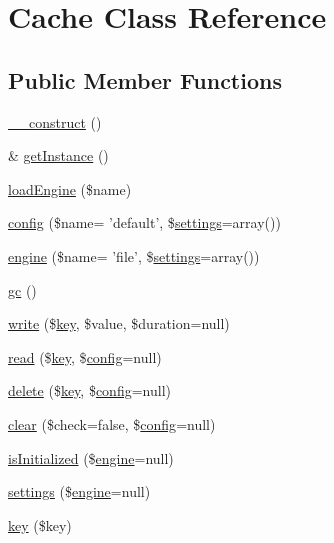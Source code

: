 \hypertarget{class_cache}{\section{Cache Class Reference}
\label{class_cache}
}
\subsection*{Public Member Functions}
\begin{DoxyCompactItemize}
\item 
\hyperlink{class_cache_a095c5d389db211932136b53f25f39685}{\-\_\-\-\_\-construct} ()
\item 
\& \hyperlink{class_cache_a24722ded84823064fa9927e17344d095}{get\-Instance} ()
\item 
\hyperlink{class_cache_a71966fba19d8d30f58bde31dac2535e4}{load\-Engine} (\$name)
\item 
\hyperlink{class_cache_aeee7a9202d7c4e6283d6b2d6fc3c49d1}{config} (\$name= 'default', \$\hyperlink{class_cache_a80459923933ac7e60f64cd512670383a}{settings}=array())
\item 
\hyperlink{class_cache_a227d1ab3c57640a1692c8d090eb4ef22}{engine} (\$name= 'file', \$\hyperlink{class_cache_a80459923933ac7e60f64cd512670383a}{settings}=array())
\item 
\hyperlink{class_cache_a14ff7ef4b198ff14884dd8c564264ca3}{gc} ()
\item 
\hyperlink{class_cache_ac9098bc72089de2a7c740dbd5ece9223}{write} (\$\hyperlink{class_cache_af4c22495d0ca7e3289b851342a57f842}{key}, \$value, \$duration=null)
\item 
\hyperlink{class_cache_a5870656fdf4e51f8bb35330a8f96ed6c}{read} (\$\hyperlink{class_cache_af4c22495d0ca7e3289b851342a57f842}{key}, \$\hyperlink{class_cache_aeee7a9202d7c4e6283d6b2d6fc3c49d1}{config}=null)
\item 
\hyperlink{class_cache_aef2e9cbd8c2e91aea52d627293fc0a28}{delete} (\$\hyperlink{class_cache_af4c22495d0ca7e3289b851342a57f842}{key}, \$\hyperlink{class_cache_aeee7a9202d7c4e6283d6b2d6fc3c49d1}{config}=null)
\item 
\hyperlink{class_cache_a35d236a4ee7acd2c6d17d03f69fde9de}{clear} (\$check=false, \$\hyperlink{class_cache_aeee7a9202d7c4e6283d6b2d6fc3c49d1}{config}=null)
\item 
\hyperlink{class_cache_a893f76ab9fd416c1558c366ff5936070}{is\-Initialized} (\$\hyperlink{class_cache_a227d1ab3c57640a1692c8d090eb4ef22}{engine}=null)
\item 
\hyperlink{class_cache_a80459923933ac7e60f64cd512670383a}{settings} (\$\hyperlink{class_cache_a227d1ab3c57640a1692c8d090eb4ef22}{engine}=null)
\item 
\hyperlink{class_cache_af4c22495d0ca7e3289b851342a57f842}{key} (\$key)
\end{DoxyCompactItemize}
